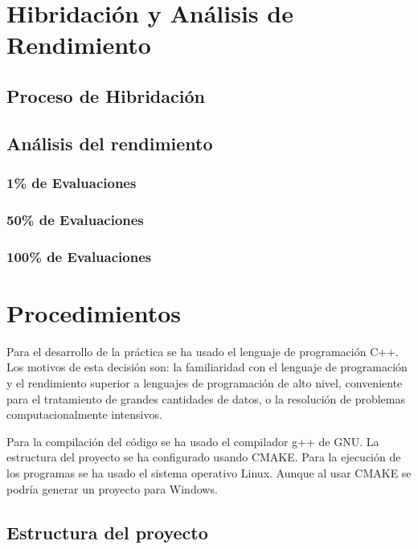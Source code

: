 \documentclass[a4paper, 12.5pt]{report}
\begin{document}
    \section{Hibridación y Análisis de Rendimiento}

    \subsection{Proceso de Hibridación}

    \subsection{Análisis del rendimiento}

    \subsubsection{1\% de Evaluaciones}

    \subsubsection{50\% de Evaluaciones}

    \subsubsection{100\% de Evaluaciones}


    \section{Procedimientos}

    Para el desarrollo de la práctica se ha usado el lenguaje de programación C++. Los motivos de esta decisión son: la familiaridad con el lenguaje de programación y el rendimiento superior a lenguajes de programación de alto nivel, conveniente para el tratamiento de grandes cantidades de datos, o la resolución de problemas computacionalmente intensivos.

    Para la compilación del código se ha usado el compilador g++ de GNU. La estructura del proyecto se ha configurado usando CMAKE. Para la ejecución de los programas se ha usado el sistema operativo Linux. Aunque al usar CMAKE se podría generar un proyecto para Windows.

    \newpage

    \subsection{Estructura del proyecto}
\end{document}
